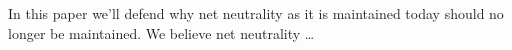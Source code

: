 
In this paper we'll defend why net neutrality as it is maintained today should no longer be maintained. We believe net neutrality \ldots %